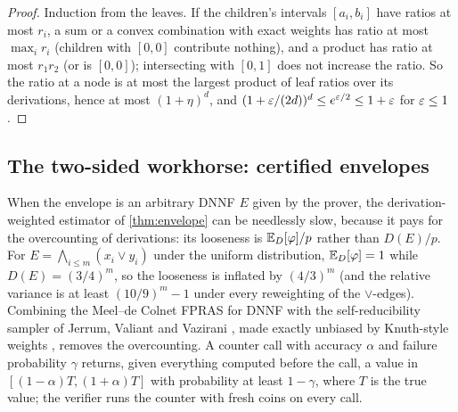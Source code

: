 \begin{proof}
Induction from the leaves. If the children's intervals $[a_i,b_i]$ have ratios
at most $r_i$, a sum or a convex combination with exact weights has ratio at
most $\max_ir_i$ (children with $[0,0]$ contribute nothing), and a product has
ratio at most $r_1r_2$ (or is $[0,0]$); intersecting with $[0,1]$ does not
increase the ratio. So the ratio at a node is at most the largest product of
leaf ratios over its derivations, hence at most $(1+\eta)^d$, and
$(1+\varepsilon/(2d))^d\le e^{\varepsilon/2}\le1+\varepsilon$ for $\varepsilon\le1$.
\end{proof}

\subsection{The two-sided workhorse: certified envelopes}

When the envelope is an arbitrary DNNF $E$ given by the prover, the
derivation-weighted estimator of \cref{thm:envelope} can be needlessly slow,
because it pays for the overcounting of derivations: its looseness is
$\mathbb{E}_D[\varphi]/p$ rather than $D(E)/p$. For $E=\bigwedge_{i\le m}(x_i\vee y_i)$
under the uniform distribution, $\mathbb{E}_D[\varphi]=1$ while $D(E)=(3/4)^m$, so the
looseness is inflated by $(4/3)^m$ (and the relative variance is at least
$(10/9)^m-1$ under every reweighting of the $\vee$-edges). Combining the
Meel--de Colnet FPRAS for DNNF \cite{meel2026dnnf} with the self-reducibility
sampler of Jerrum, Valiant and Vazirani \cite{jvv1986}, made exactly unbiased by
Knuth-style weights \cite{knuth1975}, removes the overcounting. A counter call
with accuracy $\alpha$ and failure probability $\gamma$ returns, given everything
computed before the call, a value in $[(1-\alpha)T,(1+\alpha)T]$ with probability
at least $1-\gamma$, where $T$ is the true value; the verifier runs the counter
with fresh coins on every call.

